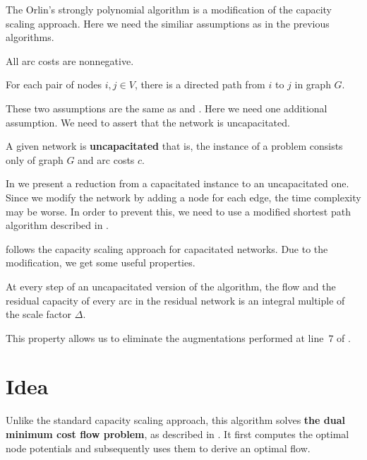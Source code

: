 The Orlin's strongly polynomial algorithm \cite{orlin1993faster} is a modification of the capacity scaling  approach. Here we need the similiar assumptions as in the previous algorithms.


\begin{assumption}\label{ass:cost_nonnegativity_orlin}
    All arc costs are nonnegative.
\end{assumption}


\begin{assumption}\label{ass:one_scc_orlin}

For each pair of nodes $i, j \in V$, there is a directed path from $i$ to $j$ in graph $G$.
\end{assumption}

These two assumptions are the same as  and . Here we need one additional assumption. We need to assert that the network is uncapacitated.

\begin{assumption}\label{ass:uncapacitated_orlin}
    A given network is \textbf{uncapacitated} that is, the instance of a problem consists only of graph $G$ and arc costs $c$.
\end{assumption}

In  we present a reduction from a capacitated instance to an uncapacitated one. Since we modify the network by adding a node for each edge, the time complexity may be worse. In order to prevent this, we need to use a modified shortest path algorithm described in .

 follows the capacity scaling approach for capacitated networks. Due to the modification, we get some useful properties.

\begin{lemma}
At every step of an uncapacitated version of the algorithm, the flow and the residual capacity of every arc in the residual network is an integral multiple of the scale factor $\Delta$.
\end{lemma}
This property allows us to eliminate the augmentations performed at line~$7$ of .

\section{Idea}

Unlike the standard capacity scaling approach, this algorithm solves \textbf{the dual minimum cost flow problem}, as described in . It first computes the optimal node potentials and subsequently uses them to derive an optimal flow. 


